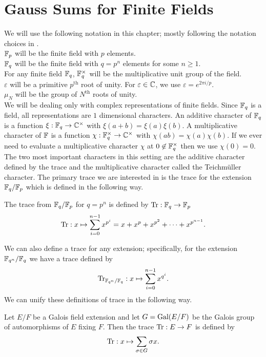 \section{Gauss Sums for Finite Fields}
\label{sec:finite-fields-intro}
\noindent We will use the following notation in this chapter; mostly following the notation choices in \cite{Lang1990}.\\
$\mathbb{F}_p$ will be the finite field with $p$ elements.\\
$\mathbb{F}_q$ will be the finite field with $q = p^n$ elements for some $n \geq 1$.\\
For any finite field $\mathbb{F}_q$, $\mathbb{F}_q^\times$ will be the multiplicative unit group of the field.\\
$\varepsilon$ will be a primitive $p^\text{th}$ root of unity. For $\varepsilon \in \mathbb{C}$, we use $\varepsilon = e^{2 \pi i /p}$.\\
$\mu_N$ will be the group of $N^\text{th}$ roots of unity.\\

We will be dealing only with complex representations of finite fields.
Since $\mathbb{F}_q$ is a field, all representations are $1$ dimensional characters.
An additive character of $\mathbb{F}_q$ is a function $\xi : \mathbb{F}_q \to \mathbb{C}^\times$ with $\xi(a + b) = \xi(a)\xi(b)$.
A multiplicative character of $\mathbb{F}$ is a function $\chi : \mathbb{F}_q^\times \to \mathbb{C}^\times$ with $\chi(ab) = \chi(a)\chi(b)$.
If we ever need to evaluate a multiplicative character $\chi$ at $0 \not \in \mathbb{F}_q^\times$ then we use $\chi(0) = 0$. \\

The two most important characters in this setting are the additive character defined by the trace and the multiplicative character called the Teichm\"uller character. 
The primary trace we are interested in is the trace for the extension $\mathbb{F}_q / \mathbb{F}_p$ which is defined in the following way.
\begin{defn}
The trace from $\mathbb{F}_q / \mathbb{F}_p$ for $q = p^n$ is defined by $\textrm{Tr} : \mathbb{F}_q \to \mathbb{F}_p$
 \[ \textrm{Tr} : x \mapsto \sum_{i=0}^{n-1} x^{p^i} = x + x^p + x^{p^2} + \cdots + x^{p^{n-1}}.\]
\end{defn}
We can also define a trace for any extension; specifically, for the extension $\mathbb{F}_{q^n}/\mathbb{F}_q$ we have a trace defined by \[\textrm{Tr}_{\mathbb{F}_{q^n}/\mathbb{F}_q} : x \mapsto \sum_{i=0}^{n-1} x^{q^i}.\] 
We can unify these definitions of trace in the following way.
\begin{defn}
Let $E/F$ be a Galois field extension and let $G = \textrm{Gal}(E/F)$ be the Galois group of automorphisms of $E$ fixing $F$. 
Then the trace $\textrm{Tr} : E \to F$ is defined by \[\textrm{Tr} : x \mapsto \sum_{\sigma \in G} \sigma x.\]
\end{defn}

